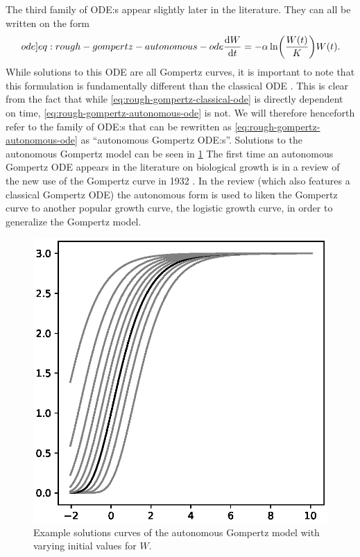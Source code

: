 The third family of ODE:s appear slightly later in the literature.
They can all be written on the form
\begin{equation} \label[ode]{eq:rough-gompertz-autonomous-ode}
  \diff{W}{t} = -\alpha \ln(\frac{W(t)}{K}) W(t).
\end{equation}
While solutions to this ODE are all Gompertz curves, it is important to note that this formulation is fundamentally different than the classical ODE .
This is clear from the fact that while \cref{eq:rough-gompertz-classical-ode} is directly dependent on time, \cref{eq:rough-gompertz-autonomous-ode} is not.
We will therefore henceforth refer to the family of ODE:s that can be rewritten as \cref{eq:rough-gompertz-autonomous-ode} as \enquote{autonomous Gompertz ODE:s}.
Solutions to the autonomous Gompertz model can be seen in \cref{fig:gompertz-autonomous-solutions}
The first time an autonomous Gompertz ODE appears in the literature on biological growth is in a review of the new use of the Gompertz curve in 1932 \cite{winsor1932gompertz}.
In the review (which also features a classical Gompertz ODE) the autonomous form is used to liken the Gompertz curve to another popular growth curve, the logistic growth curve, in order to generalize the Gompertz model.
\begin{figure}
  \centering
  \includegraphics[width=.32\textwidth]{images/gompertz-autonomous-solutions}
  \caption{Example solutions curves of the autonomous Gompertz model with varying initial values for \(W\).}
  \label{fig:gompertz-autonomous-solutions}
\end{figure}

